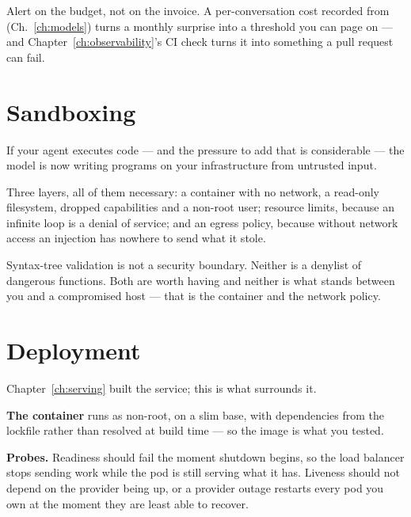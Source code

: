 \begin{note}
Alert on the budget, not on the invoice. A per-conversation cost recorded from
 (Ch.~\ref{ch:models}) turns a monthly surprise into a
threshold you can page on --- and Chapter~\ref{ch:observability}'s CI check turns
it into something a pull request can fail.
\end{note}

\section{Sandboxing}
\label{sec:sandbox}

If your agent executes code --- and the pressure to add that is considerable ---
the model is now writing programs on your infrastructure from untrusted input.

Three layers, all of them necessary: a container with no network, a read-only
filesystem, dropped capabilities and a non-root user; resource limits, because an
infinite loop is a denial of service; and an egress policy, because without
network access an injection has nowhere to send what it stole.

\begin{warning}
Syntax-tree validation is not a security boundary. Neither is a denylist of
dangerous functions. Both are worth having and neither is what stands between you
and a compromised host --- that is the container and the network policy.
\end{warning}

\section{Deployment}
\label{sec:deployment}


Chapter~\ref{ch:serving} built the service; this is what surrounds it.

\textbf{The container} runs as non-root, on a slim base, with dependencies from
the lockfile rather than resolved at build time --- so the image is what you
tested.

\textbf{Probes.} Readiness should fail the moment shutdown begins, so the load
balancer stops sending work while the pod is still serving what it has. Liveness
should not depend on the provider being up, or a provider outage restarts every
pod you own at the moment they are least able to recover.


